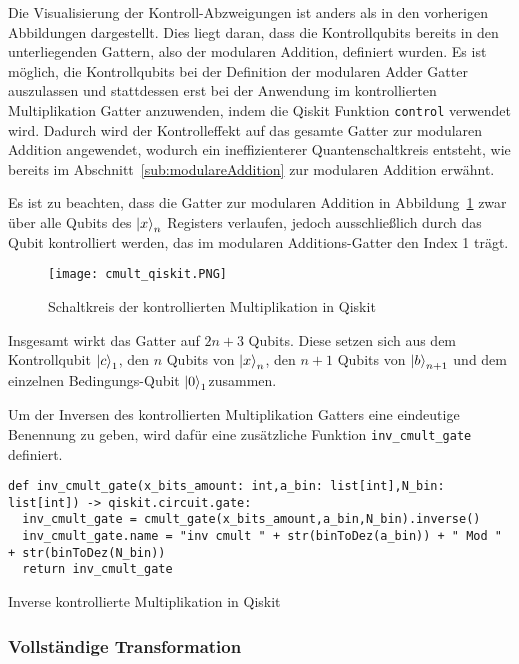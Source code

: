 Die Visualisierung der Kontroll-Abzweigungen ist anders als in den vorherigen Abbildungen dargestellt.
Dies liegt daran, dass die Kontrollqubits bereits in den unterliegenden Gattern, 
also der modularen Addition, 
definiert wurden.
Es ist möglich, die Kontrollqubits bei der Definition der modularen Adder Gatter auszulassen und 
stattdessen erst bei der Anwendung im kontrollierten Multiplikation Gatter anzuwenden, 
indem die Qiskit Funktion \texttt{control} verwendet wird.
Dadurch wird der Kontrolleffekt auf das gesamte Gatter zur modularen Addition angewendet, 
wodurch ein ineffizienterer Quantenschaltkreis entsteht, 
wie bereits im Abschnitt~\ref{sub:modulareAddition} zur modularen Addition erwähnt.

Es ist zu beachten, dass die Gatter zur modularen Addition in Abbildung~\ref{fig:cmult_qiskit} zwar über 
alle Qubits des \(\ket{x}_n\) Registers verlaufen, 
jedoch ausschließlich durch das Qubit kontrolliert werden, 
das im modularen Additions-Gatter den Index 1 trägt.

\begin{figure} [H]
  \centering
  \texttt{[image: cmult\_qiskit.PNG]}
  \caption{Schaltkreis der kontrollierten Multiplikation in Qiskit}
  \label{fig:cmult_qiskit}
\end{figure}

Insgesamt wirkt das Gatter auf \(2n+3\) Qubits.
Diese setzen sich aus dem Kontrollqubit \(\ket{c}_1\), den \(n\) Qubits von \(\ket{x}_n\), 
den \(n+1\) Qubits von \(\ket{b}_{n+1}\) und dem einzelnen Bedingungs-Qubit \(\ket{0}_1\)zusammen.

Um der Inversen des kontrollierten Multiplikation Gatters eine eindeutige Benennung zu geben, 
wird dafür eine zusätzliche Funktion \texttt{inv_cmult_gate} definiert.
\begin{listing}[H]
\begin{verbatim}  
def inv_cmult_gate(x_bits_amount: int,a_bin: list[int],N_bin: list[int]) -> qiskit.circuit.gate:  
  inv_cmult_gate = cmult_gate(x_bits_amount,a_bin,N_bin).inverse()
  inv_cmult_gate.name = "inv cmult " + str(binToDez(a_bin)) + " Mod " + str(binToDez(N_bin))
  return inv_cmult_gate
  \end{verbatim}
  \caption{Inverse kontrollierte Multiplikation in Qiskit}
  \label{code:InverseModularMultiplication}
\end{listing}

\subsubsection{Vollständige Transformation}

